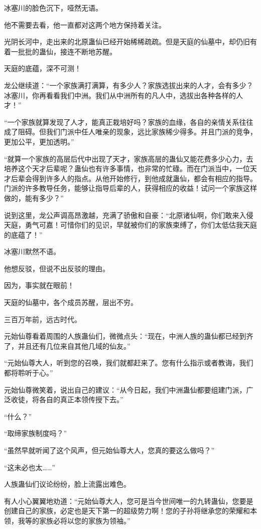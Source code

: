 \begin{this_body}
冰塞川的脸色沉下，哑然无语。

他不需要去看，他一直都对这两个地方保持着关注。

光阴长河中，走出来的北原蛊仙已经开始稀稀疏疏。但是天庭的仙墓中，却仍旧有着一批批的蛊仙，接连不断地苏醒。

天庭的底蕴，深不可测！

龙公继续道：“一个家族满打满算，有多少人？家族选拔出来的人才，会有多少？冰塞川，你再看看我们中洲。我们从中洲所有的凡人中，选拔出各种各样的人才！”

“一个家族就算发现了人才，能真正栽培好吗？家族的血缘，各自的亲情关系往往成了阻碍。但我们门派中任人唯亲的现象，远比家族稀少得多。并且门派的竞争，更加公平，更加透明。”

“就算一个家族的高层后代中出现了天才，家族高层的蛊仙又能花费多少心力，去培养这个天才后辈呢？蛊仙也有许多事情，也非常的忙碌。而在门派当中，一位天才后辈会得到许多人的指点。从他开始修行，到他成就蛊仙，都会有相应的指导。门派的许多教导任务，能够让指导后辈的人，获得相应的收益！试问一个家族这样做的，能有多少？”

说到这里，龙公声调高昂激越，充满了骄傲和自豪：“北原诸仙啊，你们敢来入侵天庭，勇气可嘉！可惜你们的见识，早就被你们的家族束缚了，你们太低估我天庭的底蕴了！”

冰塞川默然不语。

他想反驳，但说不出反驳的理由。

因为，事实就在眼前！

天庭的仙墓中，各个成员苏醒，层出不穷。

三百万年前，远古时代。

元始仙尊看着周围的人族蛊仙们，微微点头：“现在，中洲人族的蛊仙都已经到齐了，并且还有几位来自其他几域的仙友。”

“元始仙尊大人，听到您的召唤，我们就都赶来了。您有什么指示或者教诲，我们都将聆听于心。”

元始仙尊微笑着，说出自己的建议：“从今日起，我们中洲蛊仙都要组建门派，广泛收徒，将各自的真正本领传授下去。”

“什么？”

“取缔家族制度吗？”

“虽然早就听闻了这个风声，但元始仙尊大人，您真的要这么做吗？”

“这未必也太……”

人族蛊仙们议论纷纷，脸上流露出难色。

有人小心翼翼地劝道：“元始仙尊大人，您可是当今世间唯一的九转蛊仙，您要是创建自己的家族，必定也是天下第一的超级势力啊！您的子孙将继承您的荣耀和本领，我等的家族必将以您的家族为领袖。”


\end{this_body}
